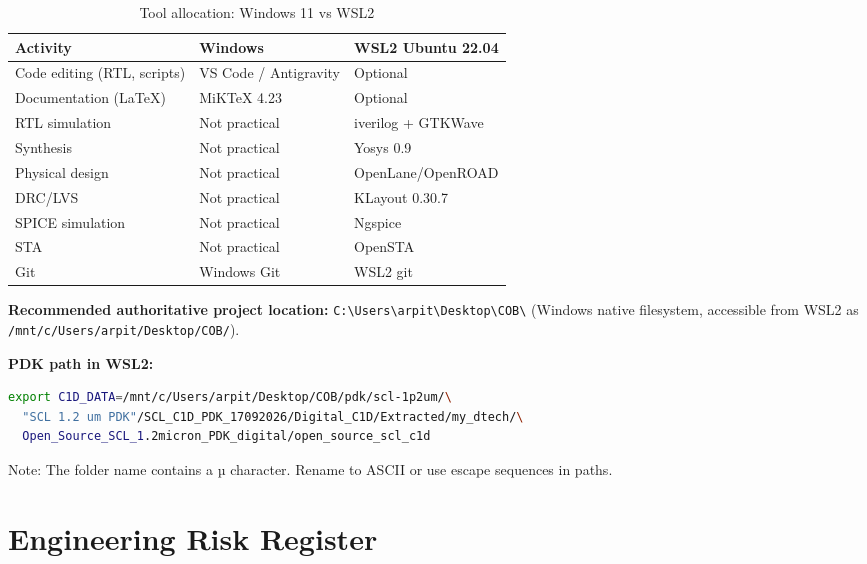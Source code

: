 \documentclass[11pt,a4paper]{article}
\begin{document}
\begin{table}[H]
  \centering
  \caption{Tool allocation: Windows 11 vs WSL2}
  \begin{tabular}{lll}
    \toprule
    \textbf{Activity} & \textbf{Windows} & \textbf{WSL2 Ubuntu 22.04} \\
    \midrule
    Code editing (RTL, scripts) & VS Code / Antigravity & Optional \\
    Documentation (LaTeX)       & MiKTeX 4.23           & Optional \\
    RTL simulation              & Not practical          & iverilog + GTKWave \\
    Synthesis                   & Not practical          & Yosys 0.9 \\
    Physical design             & Not practical          & OpenLane/OpenROAD \\
    DRC/LVS                     & Not practical          & KLayout 0.30.7 \\
    SPICE simulation            & Not practical          & Ngspice \\
    STA                         & Not practical          & OpenSTA \\
    Git                         & Windows Git            & WSL2 git \\
    \bottomrule
  \end{tabular}
\end{table}

\textbf{Recommended authoritative project location:}
\texttt{C:\textbackslash{}Users\textbackslash{}arpit\textbackslash{}Desktop\textbackslash{}COB\textbackslash{}}
(Windows native filesystem, accessible from WSL2 as \texttt{/mnt/c/Users/arpit/Desktop/COB/}).

\textbf{PDK path in WSL2:}
\begin{lstlisting}[language=bash]
export C1D_DATA=/mnt/c/Users/arpit/Desktop/COB/pdk/scl-1p2um/\
  "SCL 1.2 um PDK"/SCL_C1D_PDK_17092026/Digital_C1D/Extracted/my_dtech/\
  Open_Source_SCL_1.2micron_PDK_digital/open_source_scl_c1d
\end{lstlisting}

Note: The folder name contains a µ character. Rename to ASCII or use escape sequences in paths.

\section{Engineering Risk Register}
\end{document}
